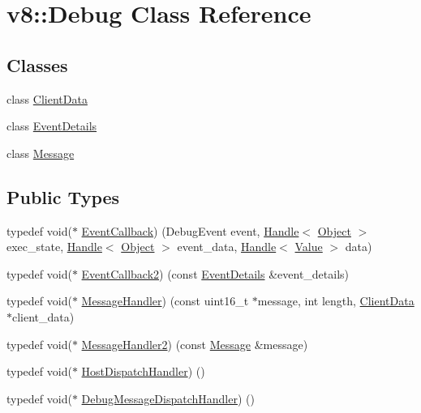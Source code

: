 \hypertarget{classv8_1_1_debug}{}\section{v8\+:\+:Debug Class Reference}
\label{classv8_1_1_debug}
\subsection*{Classes}
\begin{DoxyCompactItemize}
\item 
class \hyperlink{classv8_1_1_debug_1_1_client_data}{Client\+Data}
\item 
class \hyperlink{classv8_1_1_debug_1_1_event_details}{Event\+Details}
\item 
class \hyperlink{classv8_1_1_debug_1_1_message}{Message}
\end{DoxyCompactItemize}
\subsection*{Public Types}
\begin{DoxyCompactItemize}
\item 
typedef void($\ast$ \hyperlink{classv8_1_1_debug_a4be52510b70764b730dd1289bd9bbe37}{Event\+Callback}) (Debug\+Event event, \hyperlink{classv8_1_1_handle}{Handle}$<$ \hyperlink{classv8_1_1_object}{Object} $>$ exec\+\_\+state, \hyperlink{classv8_1_1_handle}{Handle}$<$ \hyperlink{classv8_1_1_object}{Object} $>$ event\+\_\+data, \hyperlink{classv8_1_1_handle}{Handle}$<$ \hyperlink{classv8_1_1_value}{Value} $>$ data)
\item 
typedef void($\ast$ \hyperlink{classv8_1_1_debug_aae787219311eeedcbbe2c63cf36d1e53}{Event\+Callback2}) (const \hyperlink{classv8_1_1_debug_1_1_event_details}{Event\+Details} \&event\+\_\+details)
\item 
typedef void($\ast$ \hyperlink{classv8_1_1_debug_aea5c8ab838a3b3c263a71828fb0767ac}{Message\+Handler}) (const uint16\+\_\+t $\ast$message, int length, \hyperlink{classv8_1_1_debug_1_1_client_data}{Client\+Data} $\ast$client\+\_\+data)
\item 
typedef void($\ast$ \hyperlink{classv8_1_1_debug_a0fb8f7e1f8fa47cb23f7ad72cd533c77}{Message\+Handler2}) (const \hyperlink{classv8_1_1_debug_1_1_message}{Message} \&message)
\item 
typedef void($\ast$ \hyperlink{classv8_1_1_debug_a442f686afe7d80928b57b3ff8ac3f6e7}{Host\+Dispatch\+Handler}) ()
\item 
typedef void($\ast$ \hyperlink{classv8_1_1_debug_a91cd8aa9743e3478bc63fe73abcd557c}{Debug\+Message\+Dispatch\+Handler}) ()
\end{DoxyCompactItemize}
